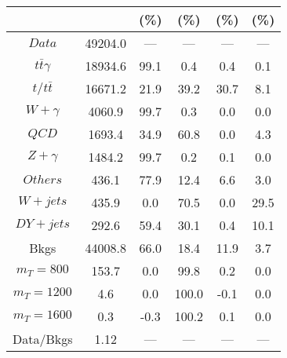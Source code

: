\begin{figure}
\begin{minipage}[c]{0.32\textwidth}
{\begin{tabular}{cccccc}
 &  & (\%) & (\%) & (\%) & (\%)  \\
\hline
                                                                      $ Data $ &  49204.0 &  --- &  --- &  --- &  ---\\
$ t\bar{t}\gamma $ &  18934.6 &  99.1 &  0.4 &  0.4 &  0.1\\
$ t/t\bar{t} $ &  16671.2 &  21.9 &  39.2 &  30.7 &  8.1\\
$ W+\gamma $ &  4060.9 &  99.7 &  0.3 &  0.0 &  0.0\\
$ QCD $ &  1693.4 &  34.9 &  60.8 &  0.0 &  4.3\\
$ Z+\gamma $ &  1484.2 &  99.7 &  0.2 &  0.1 &  0.0\\
$ Others $ &  436.1 &  77.9 &  12.4 &  6.6 &  3.0\\
$ W+jets $ &  435.9 &  0.0 &  70.5 &  0.0 &  29.5\\
$ DY+jets $ &  292.6 &  59.4 &  30.1 &  0.4 &  10.1\\
Bkgs &  44008.8 &  66.0 &  18.4 &  11.9 &  3.7\\
$ m_{T} = 800 $ &  153.7 &  0.0 &  99.8 &  0.2 &  0.0\\
$ m_{T} = 1200 $ &  4.6 &  0.0 &  100.0 &  -0.1 &  0.0\\
$ m_{T} = 1600 $ &  0.3 &  -0.3 &  100.2 &  0.1 &  0.0\\
Data/Bkgs &  1.12 &  --- &  --- &  --- &  ---\\
\hline
\end{tabular}
}
\end{minipage}
\end{figure}

